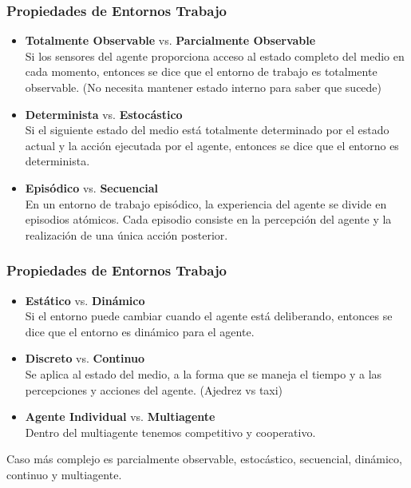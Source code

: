 \documentclass[xcolor=table]{beamer}
\begin{document}
\begin{frame}\frametitle{Propiedades de Entornos Trabajo} \footnotesize  
 
\begin{itemize}
\item \textbf{Totalmente Observable} vs.  \textbf{Parcialmente Observable}\\
Si los sensores del agente proporciona acceso al estado completo del medio en cada momento, entonces se dice que el entorno de trabajo es totalmente observable. (No necesita mantener estado interno para saber que sucede)

\item \textbf{Determinista} vs.  \textbf{Estocástico}\\
Si el siguiente estado del medio está totalmente determinado por el estado actual y la acción ejecutada por el agente, entonces se dice que el entorno es determinista.

\item \textbf{Episódico} vs.  \textbf{Secuencial}\\
En un entorno de trabajo episódico, la experiencia del agente se divide en episodios atómicos. Cada episodio consiste en la percepción del agente y la realización de una única acción posterior.

\end{itemize}


\end{frame}
\begin{frame}\frametitle{Propiedades de Entornos Trabajo} \footnotesize  
 
\begin{itemize}
\item \textbf{Estático} vs.  \textbf{Dinámico}\\
Si el entorno puede cambiar cuando el agente está deliberando, entonces se dice que el entorno es dinámico para el agente.

\item \textbf{Discreto} vs.  \textbf{Continuo}\\
Se aplica al estado del medio, a la forma que se maneja el tiempo y a las percepciones y acciones del agente. (Ajedrez vs taxi)


\item \textbf{Agente Individual} vs.  \textbf{Multiagente}\\
Dentro del multiagente tenemos competitivo y cooperativo.
\end{itemize}

 \vspace*{0,4cm}

Caso más complejo es parcialmente observable, estocástico, secuencial, dinámico, continuo y multiagente. 
\end{frame}
\end{document}
